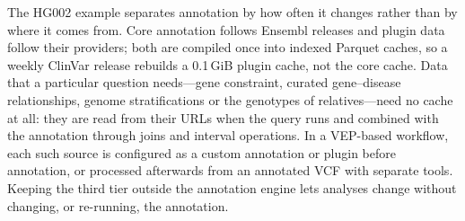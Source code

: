 The HG002 example separates annotation by how often it changes rather than
by where it comes from. Core annotation follows Ensembl releases and plugin
data follow their providers; both are compiled once into indexed Parquet
caches, so a weekly ClinVar release rebuilds a 0.1\,GiB plugin cache, not
the core cache. Data that a particular question needs---gene constraint,
curated gene--disease relationships, genome stratifications or the genotypes
of relatives---need no cache at all: they are read from their URLs when the
query runs and combined with the annotation through joins and interval
operations. In a VEP-based workflow, each such source is configured as a
custom annotation or plugin before annotation, or processed afterwards from
an annotated VCF with separate tools. Keeping the third tier outside the
annotation engine lets analyses change without changing, or re-running,
the annotation.
